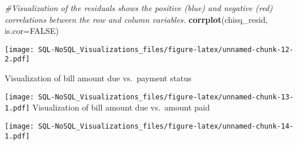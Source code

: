 \documentclass[]{article}
\newenvironment{Shaded}{\begin{snugshade}}{\end{snugshade}}
\newcommand{\KeywordTok}[1]{\textcolor[rgb]{0.13,0.29,0.53}{\textbf{#1}}}
\newcommand{\DataTypeTok}[1]{\textcolor[rgb]{0.13,0.29,0.53}{#1}}
\newcommand{\DecValTok}[1]{\textcolor[rgb]{0.00,0.00,0.81}{#1}}
\newcommand{\StringTok}[1]{\textcolor[rgb]{0.31,0.60,0.02}{#1}}
\newcommand{\CommentTok}[1]{\textcolor[rgb]{0.56,0.35,0.01}{\textit{#1}}}
\newcommand{\OtherTok}[1]{\textcolor[rgb]{0.56,0.35,0.01}{#1}}
\newcommand{\OperatorTok}[1]{\textcolor[rgb]{0.81,0.36,0.00}{\textbf{#1}}}
\newcommand{\NormalTok}[1]{#1}
\begin{document}
\begin{Shaded}
\begin{Highlighting}[]
\CommentTok{#Visualization of the residuals shows the positive (blue) and negative (red) correlations between the row and column variables.}
\KeywordTok{corrplot}\NormalTok{(chisq_resid, }\DataTypeTok{is.cor=}\OtherTok{FALSE}\NormalTok{)}
\end{Highlighting}
\end{Shaded}

\texttt{[image: SQL-NoSQL\_Visualizations\_files/figure-latex/unnamed-chunk-12-2.pdf]}

Visualization of bill amount due vs.~payment status

\begin{Shaded}
\end{Shaded}

\texttt{[image: SQL-NoSQL\_Visualizations\_files/figure-latex/unnamed-chunk-13-1.pdf]}
Visualization of bill amount due vs.~amount paid

\begin{Shaded}
\end{Shaded}

\texttt{[image: SQL-NoSQL\_Visualizations\_files/figure-latex/unnamed-chunk-14-1.pdf]}
\end{document}
